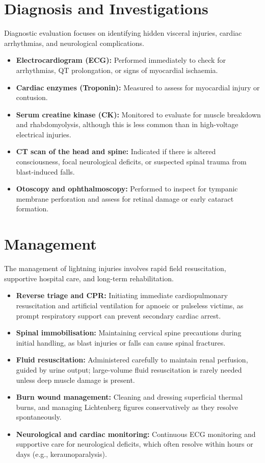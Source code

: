 \section*{Diagnosis and Investigations}
Diagnostic evaluation focuses on identifying hidden visceral injuries, cardiac arrhythmias, and neurological complications.
\begin{itemize}
    \item \textbf{Electrocardiogram (ECG):} Performed immediately to check for arrhythmias, QT prolongation, or signs of myocardial ischaemia.
    \item \textbf{Cardiac enzymes (Troponin):} Measured to assess for myocardial injury or contusion.
    \item \textbf{Serum creatine kinase (CK):} Monitored to evaluate for muscle breakdown and rhabdomyolysis, although this is less common than in high-voltage electrical injuries.
    \item \textbf{CT scan of the head and spine:} Indicated if there is altered consciousness, focal neurological deficits, or suspected spinal trauma from blast-induced falls.
    \item \textbf{Otoscopy and ophthalmoscopy:} Performed to inspect for tympanic membrane perforation and assess for retinal damage or early cataract formation.
\end{itemize}

\section*{Management}
The management of lightning injuries involves rapid field resuscitation, supportive hospital care, and long-term rehabilitation.
\begin{itemize}
    \item \textbf{Reverse triage and CPR:} Initiating immediate cardiopulmonary resuscitation and artificial ventilation for apnoeic or pulseless victims, as prompt respiratory support can prevent secondary cardiac arrest.
    \item \textbf{Spinal immobilisation:} Maintaining cervical spine precautions during initial handling, as blast injuries or falls can cause spinal fractures.
    \item \textbf{Fluid resuscitation:} Administered carefully to maintain renal perfusion, guided by urine output; large-volume fluid resuscitation is rarely needed unless deep muscle damage is present.
    \item \textbf{Burn wound management:} Cleaning and dressing superficial thermal burns, and managing Lichtenberg figures conservatively as they resolve spontaneously.
    \item \textbf{Neurological and cardiac monitoring:} Continuous ECG monitoring and supportive care for neurological deficits, which often resolve within hours or days (e.g., keraunoparalysis).
\end{itemize}

